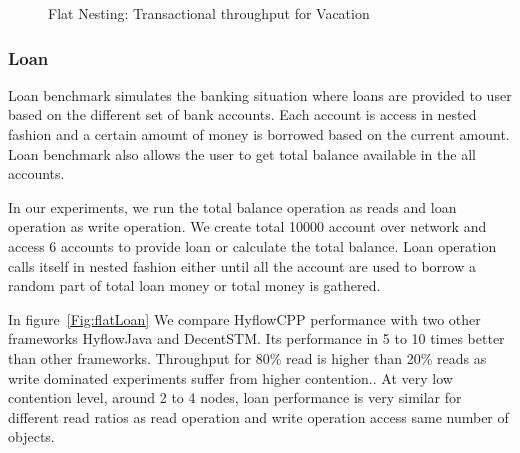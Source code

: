 \documentclass[12pt,english]{report}
\begin{document}
\begin{figure}[H]
\centering
{}
\end{figure}
\begin{figure}[H]
\centering
{}
\end{figure}

\begin{figure}[H]
\centering
{}
\caption{Flat Nesting: Transactional throughput for Vacation}
\label{Fig:flatVacation}
\end{figure}

\subsubsection{Loan}

Loan benchmark simulates the banking situation where loans are provided to user based on the different set of bank accounts. Each account is access in nested fashion and a certain amount of money is borrowed based on the current amount. Loan benchmark also allows the user to get total balance available in the all accounts.

In our experiments, we run the total balance operation as reads and loan operation as write operation. We create total 10000 account over network and access 6 accounts to provide loan or calculate the total balance.
Loan operation calls itself in nested fashion either until all the account are used to borrow a random part of total loan money or total money is gathered.

In figure~\ref{Fig:flatLoan} We compare HyflowCPP performance with two other frameworks HyflowJava and DecentSTM. Its performance in 5 to 10 times better than other frameworks. Throughput for 80\% read is higher than 20\% reads as write dominated experiments suffer from higher contention.. At very low contention level, around 2 to 4 nodes, loan performance is very similar for different read ratios as read operation and write operation access same number of objects. 

\begin{figure}[H]
\centering
{}
\end{figure}
\begin{figure}[H]
\centering
{}
\end{figure}
\end{document}
